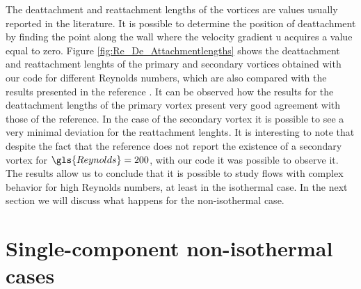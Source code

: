 The deattachment and reattachment lengths of the vortices are values usually reported in the literature. It is possible to determine the position of deattachment by finding the point along the wall where the velocity gradient u acquires a value equal to zero. %
Figure \cref{fig:Re_De_Attachmentlengths} shows the deattachment and reattachment lenghts of the primary and secondary vortices obtained with our code for different Reynolds numbers, which are also compared with the results presented in the reference \cite{biswasBackwardFacingStepFlows2004}. It can be observed how the results for the deattachment lengths of the primary vortex present very good agreement with those of the reference. In the case of the secondary vortex it is possible to see a very minimal deviation for the reattachment lenghts. It is interesting to note that despite the fact that the reference does not report the existence of a secondary vortex for $\gls{Reynolds} = 200$, with our code it was possible to observe it. The results allow us to conclude that it is possible to study flows with complex behavior for high Reynolds numbers, at least in the isothermal case. In the next section we will discuss what happens for the non-isothermal case.







\section{Single-component non-isothermal cases}

